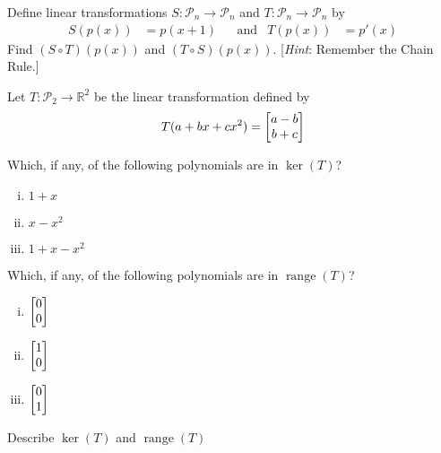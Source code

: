 \documentclass[boxes]{gsypset}
\DeclareMathOperator{\range}{range}
\begin{document}
	\begin{problem}[6.4.27]
		Define linear transformations $S: \mathscr{P}_n \to \mathscr{P}_n$ and
		$T: \mathscr{P}_n \to \mathscr{P}_n$ by
		\begin{align*}
			S(p(x)) &= p(x+1) &
			&\text{and}&
			T(p(x)) &= p'(x)
		\end{align*}
		Find $(S \circ T)(p(x))$ and $(T \circ S)(p(x))$.
		[\textit{Hint}: Remember the Chain Rule.]
	\end{problem}
	\begin{solution}
		
	\end{solution}
	
	\begin{problem}[6.5.3]
		Let $T: \mathscr{P}_2 \to \mathbb{R}^2$ be the linear transformation defined by
		\[
			T(a + bx + cx^2) = \begin{bmatrix}a-b\\b+c\end{bmatrix}
		\]
		\begin{subproblems}[(a)]
			\subproblem Which, if any, of the following polynomials are in $\ker(T)$?
				\begin{solution}
					\begin{enumerate}[(i)]
						\item $1+x$
						\item $x-x^2$
						\item $1+x-x^2$
					\end{enumerate}
				\end{solution}
			\subproblem Which, if any, of the following polynomials are in $\range(T)$?
				\begin{solution}
					\begin{enumerate}[(i)]
						\item $\begin{bmatrix}0\\0\end{bmatrix}$
						\item $\begin{bmatrix}1\\0\end{bmatrix}$
						\item $\begin{bmatrix}0\\1\end{bmatrix}$
					\end{enumerate}
				\end{solution}
			\subproblem Describe $\ker(T)$ and $\range(T)$
			\begin{solution}
				
			\end{solution}
		\end{subproblems}
	\end{problem}
	\begin{solution}
		
	\end{solution}
	
\end{document}
